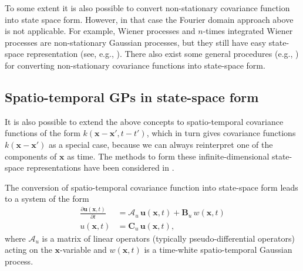 \documentclass[journal]{IEEEtran}
\begin{document}
To some extent it is also possible to convert non-stationary covariance function into state space form. However, in that case the Fourier domain approach above is not applicable. For example, Wiener processes and $n$-times integrated Wiener processes are non-stationary Gaussian processes, but they still have easy state-space representation (see, e.g., \cite{Solin:2016}). There also exist some general procedures (e.g., \cite{Anderson:1969,Van-Trees:1971}) for converting non-stationary covariance functions into state-space form.

\subsection{Spatio-temporal GPs in state-space form}

It is also possible to extend the above concepts to spatio-temporal covariance functions of the form $k(\mathbf{x} - \mathbf{x}', t-t')$, which in turn gives covariance functions $k(\mathbf{x} - \mathbf{x}')$ as a special case, because we can always reinterpret one of the components of $\mathbf{x}$ as time. The methods to form these infinite-dimensional state-space representations have been considered in \cite{Sarkka+Hartikainen:2012,Sarkka+Solin+Hartikainen:2013}. 

The conversion of spatio-temporal covariance function into state-space form leads to a system of the form
%
\begin{equation}
\begin{split}
  \frac{\partial\mathbf{u}(\mathbf{x},t)}{\partial t} &= \mathbf{\mathcal{A}}_u \, \mathbf{u}(\mathbf{x},t)
  + \mathbf{B}_u \, w(\mathbf{x},t) \\
   u(\mathbf{x},t) &= \mathbf{C}_u \, \mathbf{u}(\mathbf{x},t),
\end{split}
\label{eq:ssu2}
\end{equation}
%
where $\mathbf{\mathcal{A}}_u$ is a matrix of linear operators (typically pseudo-differential operators) acting on the $\mathbf{x}$-variable and $w(\mathbf{x},t)$ is a time-white spatio-temporal Gaussian process.
\end{document}
